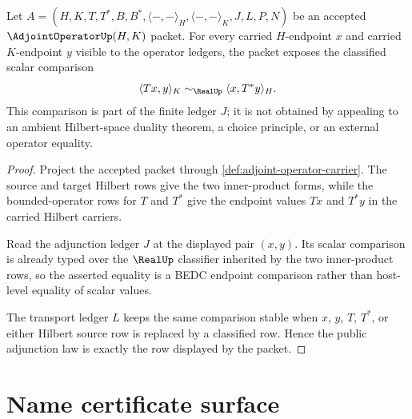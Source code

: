 \begin{theorem}
\label{thm:adjoint-operator-inner-product-adjunction}
Let $A=(H,K,T,T^\ast,B,B^\ast,\langle-,-\rangle_H,\langle-,-\rangle_K,J,L,P,N)$ be an accepted $\AdjointOperatorUp(H,K)$ packet. For every carried $H$-endpoint $x$ and carried $K$-endpoint $y$ visible to the operator ledgers, the packet exposes the classified scalar comparison
$$
\langle T x,y\rangle_K \sim_{\RealUp} \langle x,T^\ast y\rangle_H .
$$
This comparison is part of the finite ledger $J$; it is not obtained by appealing to an ambient Hilbert-space duality theorem, a choice principle, or an external operator equality.
\end{theorem}
\begin{proof}
Project the accepted packet through \autoref{def:adjoint-operator-carrier}. The source and target Hilbert rows give the two inner-product forms, while the bounded-operator rows for $T$ and $T^\ast$ give the endpoint values $T x$ and $T^\ast y$ in the carried Hilbert carriers.

Read the adjunction ledger $J$ at the displayed pair $(x,y)$. Its scalar comparison is already typed over the $\RealUp$ classifier inherited by the two inner-product rows, so the asserted equality is a BEDC endpoint comparison rather than host-level equality of scalar values.

The transport ledger $L$ keeps the same comparison stable when $x$, $y$, $T$, $T^\ast$, or either Hilbert source row is replaced by a classified row. Hence the public adjunction law is exactly the row displayed by the packet.
\end{proof}

\section{Name certificate surface}
\label{sec:adjoint-operator-namecert}

